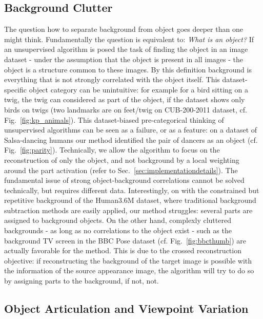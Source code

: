 	\subsection{Background Clutter}\label{sec:background}
		The question how to separate background from object goes deeper than one might think. Fundamentally the question is equivalent to: \textit{What is an object?}
		If an unsupervised algorithm is posed the task of finding the object in an image dataset - under the assumption that the object is present in all images - the object is a structure common to these images.
		By this definition background is everything that is not strongly correlated with the object itself.
		This dataset-specific object category can be unintuitive: for example for a bird sitting on a twig, the twig can considered as part of the object, if the dataset shows only birds on twigs (\eg two landmarks are on feet/twig on CUB-200-2011 dataset,  cf. Fig.~\ref{fig:kp_animals}).
		This dataset-biased pre-categorical thinking of unsupervised algorithms can be seen as a failure, or as a feature: on a dataset of Salsa-dancing humans our method identified the pair of dancers as an object (cf. Fig.~\ref{fig:parity}). 
		Technically, we allow the algorithm to focus on the reconstruction of only the object, and not background by a local weighting around the part activation (refer to Sec.~\ref{sec:implementationdetails}). The fundamental issue of strong object-background correlations cannot be solved technically, but requires different data.  Interestingly, on with the constrained but repetitive background of the Human3.6M dataset, where traditional background subtraction methods are easily applied, our method struggles: several parts are assigned to background objects. On the other hand, complexly cluttered backgrounds - as long as no correlations to the object exist - such as the background TV screen in the BBC Pose dataset (cf. Fig.~\ref{fig:bbcthumb}) are actually favorable for the method. This is due to the crossed reconstruction objective: if reconstructing the background of the target image is possible with the information of the source appearance image, the algorithm will try to do so by assigning parts to the background, if not, not.


	\subsection{Object Articulation and Viewpoint Variation}\label{sec:articulation}

